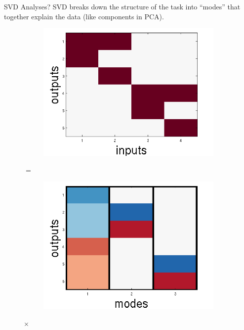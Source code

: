 \documentclass{beamer}
\begin{document}
\begin{frame}{SVD Analyses?}
SVD breaks down the structure of the task into ``modes'' that together explain the data (like components in PCA).
\begin{figure}
\centering
\begin{subfigure}{0.22\textwidth}
\includegraphics[width=\textwidth]{../writing/cogsci_2017/figures/nonlinear_IO.png}
\end{subfigure}
{\!\!\huge{$=$}\!\!}
\begin{subfigure}{0.22\textwidth}
\includegraphics[width=\textwidth]{../writing/cogsci_2017/figures/U_nl.png}
\end{subfigure}
{\!\!\LARGE{$\times$}\!\!}

\end{figure}
\end{frame}
\end{document}
